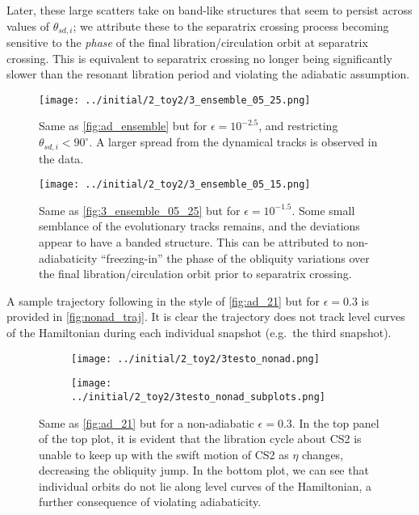\documentclass[
        fleqn,
        usenatbib,
    ]{mnras}
\begin{document}
Later, these large scatters take on band-like structures that seem to persist
across values of $\theta_{sd, i}$; we attribute these to the separatrix crossing
process becoming sensitive to the \emph{phase} of the final
libration/circulation orbit at separatrix crossing. This is equivalent to
separatrix crossing no longer being significantly slower than the resonant
libration period and violating the adiabatic assumption.
\begin{figure}
    \centering
    \texttt{[image: ../initial/2\_toy2/3\_ensemble\_05\_25.png]}
    \caption{Same as \autoref{fig:ad_ensemble} but for $\epsilon = 10^{-2.5}$,
    and restricting $\theta_{sd, i} < 90^\circ$. A larger spread from the
    dynamical tracks is observed in the data.}\label{fig:3_ensemble_05_25}
\end{figure}
\begin{figure}
    \centering
    \texttt{[image: ../initial/2\_toy2/3\_ensemble\_05\_15.png]}
    \caption{Same as \autoref{fig:3_ensemble_05_25} but for $\epsilon =
    10^{-1.5}$. Some small semblance of the evolutionary tracks remains, and the
    deviations appear to have a banded structure. This can be attributed to
    non-adiabaticity ``freezing-in'' the phase of the obliquity variations over
    the final libration/circulation orbit prior to separatrix
    crossing.}\label{fig:3_ensemble_05_15}
\end{figure}

A sample trajectory following in the style of \autoref{fig:ad_21} but for
$\epsilon = 0.3$ is provided in \autoref{fig:nonad_traj}. It is clear the
trajectory does not track level curves of the Hamiltonian during each individual
snapshot (e.g.\ the third snapshot).
\begin{figure}
    \centering
    \begin{subfigure}{\columnwidth}
        \centering
        \texttt{[image: ../initial/2\_toy2/3testo\_nonad.png]}
    \end{subfigure}
    \begin{subfigure}{\columnwidth}
        \centering
        \texttt{[image: ../initial/2\_toy2/3testo\_nonad\_subplots.png]}
    \end{subfigure}
    \caption{Same as \autoref{fig:ad_21} but for a non-adiabatic $\epsilon =
    0.3$. In the top panel of the top plot, it is evident that the libration
    cycle about CS2 is unable to keep up with the swift motion of CS2 as $\eta$
    changes, decreasing the obliquity jump. In the bottom plot, we can see that
    individual orbits do not lie along level curves of the Hamiltonian, a
    further consequence of violating adiabaticity.}\label{fig:nonad_traj}
\end{figure}
\end{document}
